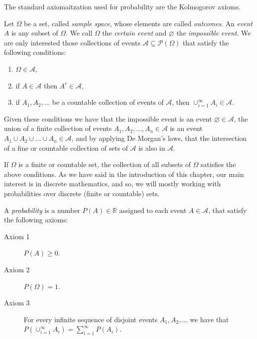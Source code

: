 The standard axiomaitzation used for probability are the Kolmogorov axioms.


Let $\Omega$ be a set, called \emph{sample space}, whose elements are called \emph{outcomes}. An \emph{event} $A$ is any subset of $\Omega$. We call $\Omega$ the \emph{certain event} and $\varnothing$ the \emph{impossible event}. We are only interested those collections of events $\mathcal{A} \subseteq \mathcal{P}\left( \Omega \right)$ that satisfy the following conditions:

\begin{enumerate}[label=(\roman*)]
\item $\Omega \in \mathcal{A}$, 
\item if $A \in \mathcal{A}$ then $A^c \in \mathcal{A}$,
\item if $A_1, A_2, \ldots$ be a countable collection of events of $\mathcal{A}$, then $\cup_{i=1}^\infty A_i \in \mathcal{A}$.
\end{enumerate}

Given these conditions we have that the impossible event is an event $\varnothing \in \mathcal{A}$, the union of a finite collection of events $A_1, A_2, \ldots, A_n \in \mathcal{A}$ is an event $A_1 \cup A_2 \cup \ldots \cup A_n \in \mathcal{A}$, and by applying De Morgan's laws, that the intersection of a fine or countable collection of sets of $\mathcal{A}$ is also in $\mathcal{A}$.

If $\Omega$ is a finite or countable set, the collection of all subsets of $\Omega$ satisfies the above conditions. As we have said in the introduction of this chapter, our main interest is in discrete mathematics, and so, we will mostly working with probabilities over discrete (finite or countable) sets.

A \emph{probability} is a number $P(A) \in \mathbb{R}$ assigned to each event $A \in \mathcal{A}$, that satisfy the following axioms:

\medskip

\begin{description}
\item [Axiom 1] $P(A) \geq 0$.
\item [Axiom 2] $P(\Omega) = 1$.
\item [Axiom 3] For every infinite sequence of disjoint events $A_1, A_2, \ldots$ we have that $P(\cup_{i=1}^\infty A_i) = \sum_{i=1}^\infty P(A_i)$.
\end{description}

